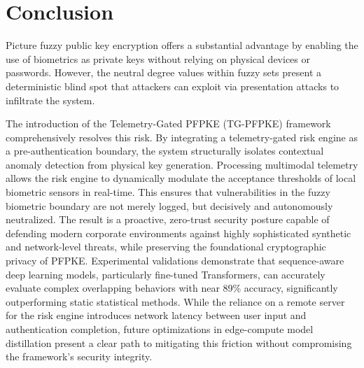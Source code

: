 \documentclass[pdflatex,sn-mathphys-num]{sn-jnl}
\theoremstyle{thmstyleone}%
\theoremstyle{thmstyletwo}%
\theoremstyle{thmstylethree}%
\begin{document}
\section{Conclusion}\label{sec7}

Picture fuzzy public key encryption offers a substantial advantage by enabling the use of biometrics as private keys without relying on physical devices or passwords. However, the neutral degree values within fuzzy sets present a deterministic blind spot that attackers can exploit via presentation attacks to infiltrate the system.

The introduction of the Telemetry-Gated PFPKE (TG-PFPKE) framework comprehensively resolves this risk. By integrating a telemetry-gated risk engine as a pre-authentication boundary, the system structurally isolates contextual anomaly detection from physical key generation. Processing multimodal telemetry allows the risk engine to dynamically modulate the acceptance thresholds of local biometric sensors in real-time. This ensures that vulnerabilities in the fuzzy biometric boundary are not merely logged, but decisively and autonomously neutralized. The result is a proactive, zero-trust security posture capable of defending modern corporate environments against highly sophisticated synthetic and network-level threats, while preserving the foundational cryptographic privacy of PFPKE. Experimental validations demonstrate that sequence-aware deep learning models, particularly fine-tuned Transformers, can accurately evaluate complex overlapping behaviors with near 89\% accuracy, significantly outperforming static statistical methods. While the reliance on a remote server for the risk engine introduces network latency between user input and authentication completion, future optimizations in edge-compute model distillation present a clear path to mitigating this friction without compromising the framework's security integrity.


\newpage

\nocite{*}

\end{document}
